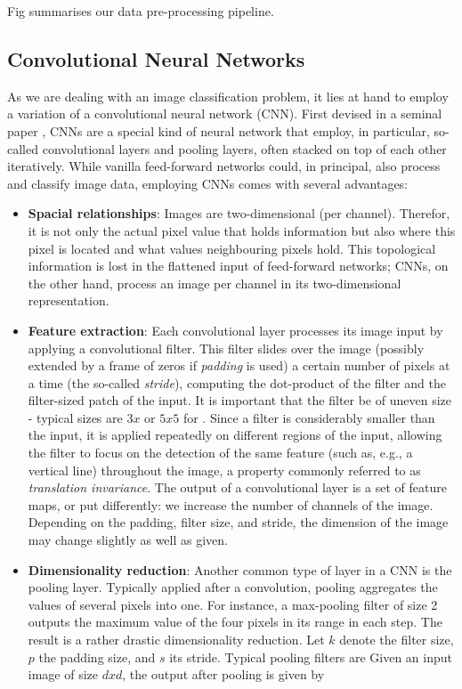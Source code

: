 \documentclass[british,12p]{article}
\begin{document}
    	Fig summarises our data pre-processing pipeline. 
    	
    	
    \subsection{Convolutional Neural Networks}\label{secCNN}
    As we are dealing with an image classification problem, it lies at hand to employ a variation of a convolutional neural network (CNN). First devised in a seminal paper , CNNs are a special kind of neural network that employ, in particular, so-called convolutional layers and pooling layers, often stacked on top of each other iteratively. While vanilla feed-forward networks could, in principal, also process and classify image data, employing CNNs comes with several advantages:
    \begin{itemize}
    	\item \textbf{Spacial relationships}: Images are two-dimensional	(per channel). Therefor, it is not only the actual pixel value that holds information but also where this pixel is located and what values neighbouring pixels hold. This topological information is lost in the flattened input of feed-forward networks; CNNs, on the other hand, process an image per channel in its two-dimensional representation. 
    	\item \textbf{Feature extraction}: Each convolutional layer processes its image input by applying a convolutional filter. This filter slides over the image (possibly extended by a frame of zeros if \textit{padding} is used) a certain number of pixels at a time (the so-called \textit{stride}), computing the dot-product of the filter and the filter-sized patch of the input. It is important that the filter be of uneven size - typical sizes are $3x$ or $5x5$ for . Since a filter is considerably smaller than the input, it is applied repeatedly on different regions of the input, allowing the filter to focus on the detection of the same feature (such as, e.g., a vertical line) throughout the image, a property commonly referred to as \textit{translation invariance}. The output of a convolutional layer is a set of feature maps, or put differently: we increase the number of channels of the image. Depending on the padding, filter size, and stride, the dimension of the image may change slightly as well as given.
    	\item \textbf{Dimensionality reduction}: Another common type of layer in a CNN is the pooling layer. Typically applied after a convolution, pooling aggregates the values of several pixels into one. For instance, a max-pooling filter of size 2 outputs the maximum value of the four pixels in its range in each step. The result is a rather drastic dimensionality reduction. Let $k$ denote the filter size, $p$ the padding size, and $s$ its stride. Typical pooling filters are Given an input image of size $dxd$, the output after pooling is given by

\end{itemize}
\end{document}
